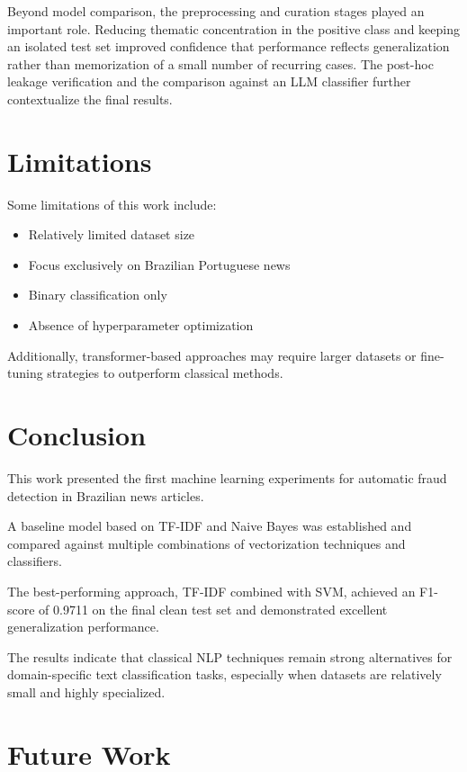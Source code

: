 \documentclass[conference]{IEEEtran}
\begin{document}
Beyond model comparison, the preprocessing and curation stages played an important role. Reducing thematic concentration in the positive class and keeping an isolated test set improved confidence that performance reflects generalization rather than memorization of a small number of recurring cases. The post-hoc leakage verification and the comparison against an LLM classifier further contextualize the final results.

\section{Limitations}

Some limitations of this work include:

\begin{itemize}
    \item Relatively limited dataset size
    \item Focus exclusively on Brazilian Portuguese news
    \item Binary classification only
    \item Absence of hyperparameter optimization
\end{itemize}

Additionally, transformer-based approaches may require larger datasets or fine-tuning strategies to outperform classical methods.

\section{Conclusion}

This work presented the first machine learning experiments for automatic fraud detection in Brazilian news articles.

A baseline model based on TF-IDF and Naive Bayes was established and compared against multiple combinations of vectorization techniques and classifiers.

The best-performing approach, TF-IDF combined with SVM, achieved an F1-score of 0.9711 on the final clean test set and demonstrated excellent generalization performance.

The results indicate that classical NLP techniques remain strong alternatives for domain-specific text classification tasks, especially when datasets are relatively small and highly specialized.

\section{Future Work}
\end{document}

